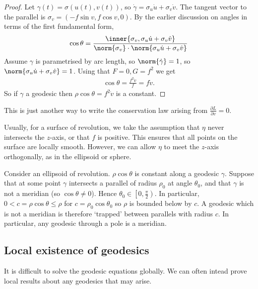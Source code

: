 \begin{proof}
	Let $\gamma(t) = \sigma(u(t),v(t))$, so $\dot\gamma = \sigma_u \dot u + \sigma_v \dot v$.
	The tangent vector to the parallel is $\sigma_v = (-f \sin v, f \cos v, 0)$.
	By the earlier discussion on angles in terms of the first fundamental form,
	\begin{align*}
		\cos \theta = \frac{\inner{\sigma_v, \sigma_u \dot u + \sigma_v \dot v}}{\norm{\sigma_v} \cdot \norm{\sigma_u \dot u + \sigma_v \dot v}}
	\end{align*}
	Assume $\gamma$ is parametrised by arc length, so $\norm{\dot \gamma} = 1$, so $\norm{\sigma_u \dot u + \sigma_v \dot v} = 1$.
	Using that $F = 0, G = f^2$ we get
	\begin{align*}
		\cos \theta = \frac{f^2 \dot{v}}{f} = f \dot{v}.
	\end{align*}
	So if $\gamma$ a geodesic then $\rho \cos \theta = f^2 \dot{v}$ is a constant.
\end{proof}

This is just another way to write the conservation law arising from $\frac{\partial L}{\partial v} = 0$.

\begin{example}
	Usually, for a surface of revolution, we take the assumption that $\eta$ never intersects the $z$-axis, or that $f$ is positive.
	This ensures that all points on the surface are locally smooth.
	However, we can allow $\eta$ to meet the $z$-axis orthogonally, as in the ellipsoid or sphere.

	Consider an ellipsoid of revolution.
	$\rho \cos \theta$ is constant along a geodesic $\gamma$.
	Suppose that at some point $\gamma$ intersects a parallel of radius $\rho_0$ at angle $\theta_0$, and that $\gamma$ is not a meridian (so $\cos \theta \neq 0$).
	Hence $\theta_0 \in \left[0, \frac{\pi}{2}\right)$.
	In particular, $0 < c = \rho \cos \theta \leq \rho$ for $c = \rho_0 \cos \theta_0$ so $\rho$ is bounded below by $c$.
	A geodesic which is not a meridian is therefore `trapped' between parallels with radius $c$.
	In particular, any geodesic through a pole is a meridian.
\end{example}

\subsection{Local existence of geodesics}
It is difficult to solve the geodesic equations globally.
We can often intead prove local results about any geodesics that may arise.

